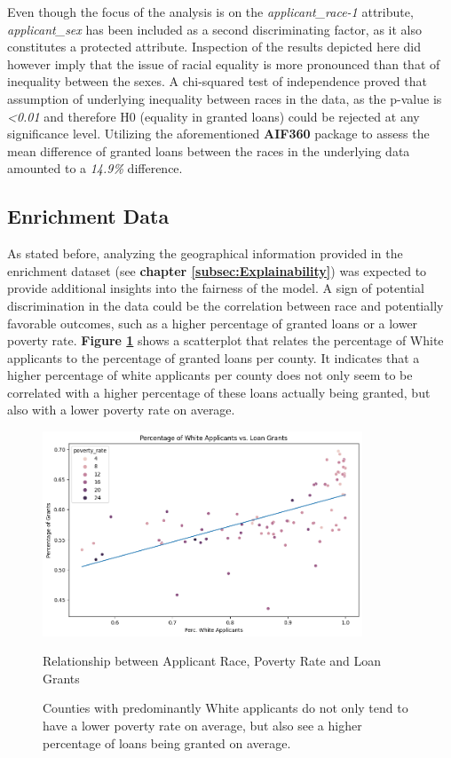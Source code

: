 Even though the focus of the analysis is on the \textit{applicant\_race-1} attribute, \textit{applicant\_sex} has been included as a second discriminating factor, as it also constitutes a protected attribute.
Inspection of the results depicted here did however imply that the issue of racial equality is more pronounced than that of inequality between the sexes.
A chi-squared test of independence proved that assumption of underlying inequality between races in the data, as the p-value is \textit{<0.01} and therefore H0 (equality in granted loans) could be rejected at any significance level.
Utilizing the aforementioned \textbf{AIF360} package to assess the mean difference of granted loans between the races in the underlying data amounted to a \textit{14.9\%} difference.

\subsection{Enrichment Data}\label{subsec:Enrichment_Data}

As stated before, analyzing the geographical information provided in the enrichment dataset (see \textbf{chapter \ref{subsec:Explainability}}) was expected to provide additional insights into the fairness of the model.
A sign of potential discrimination in the data could be the correlation between race and potentially favorable outcomes, such as a higher percentage of granted loans or a lower poverty rate.
\textbf{Figure \ref{fig:Scatter_White_Applicants_Loan_Grant}} shows a scatterplot that relates the percentage of White applicants to the percentage of granted loans per county. It indicates that a higher percentage of white applicants per county does not only seem to be correlated with a higher percentage of these loans actually being granted, but also with a lower poverty rate on average.

\begin{figure}[h]
    \centering
    \includegraphics[width=0.85\textwidth]{images/CHXX_Perc_Grants_vs_Perc_White.png}
    \caption{Relationship between Applicant Race, Poverty Rate and Loan Grants}
    \caption*{Counties with predominantly White applicants do not only tend to have a lower poverty rate on average, but also see a higher percentage of loans being granted on average.}
    \label{fig:Scatter_White_Applicants_Loan_Grant}
\end{figure}

